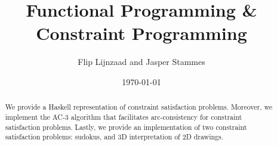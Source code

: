 \documentclass[12pt,a4paper]{article}
\title{Functional Programming \& Constraint Programming}
\author{Flip Lijnzaad and Jasper Stammes}
\date{\today}
\begin{document}
\maketitle

\begin{abstract}
We provide a Haskell representation of constraint satisfaction problems.
Moreover, we implement the AC-3 algorithm that facilitates arc-consistency for constraint satisfaction problems.
Lastly, we provide an implementation of two constraint satisfaction problems:
sudokus, and 3D interpretation of 2D drawings.
\end{abstract}

\vfill

\tableofcontents

\clearpage
















\newpage
\appendix




\end{document}
